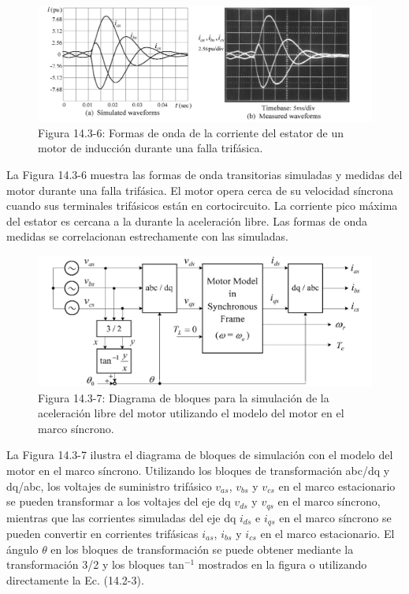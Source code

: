 \documentclass[letterpaper,12pt]{article}
\begin{document}
\begin{figure}[ht]
\centering
\includegraphics{graficos/img08.jpg}
\caption{Figura 14.3-6: Formas de onda de la corriente del estator de un motor de inducción durante una falla trifásica.}
\end{figure}
\FloatBarrier

La Figura 14.3-6 muestra las formas de onda transitorias simuladas y medidas del motor durante una falla trifásica. El motor opera cerca de su velocidad síncrona cuando sus terminales trifásicos están en cortocircuito. La corriente pico máxima del estator es cercana a la durante la aceleración libre. Las formas de onda medidas se correlacionan estrechamente con las simuladas.

\begin{figure}[ht]
\centering
\includegraphics{graficos/img09.jpg}
\caption{Figura 14.3-7: Diagrama de bloques para la simulación de la aceleración libre del motor utilizando el modelo del motor en el marco síncrono.}
\end{figure}
\FloatBarrier

La Figura 14.3-7 ilustra el diagrama de bloques de simulación con el modelo del motor en el marco síncrono. Utilizando los bloques de transformación abc/dq y dq/abc, los voltajes de suministro trifásico $v_{as}$, $v_{bs}$ y $v_{cs}$ en el marco estacionario se pueden transformar a los voltajes del eje dq $v_{ds}$ y $v_{qs}$ en el marco síncrono, mientras que las corrientes simuladas del eje dq $i_{ds}$ e $i_{qs}$ en el marco síncrono se pueden convertir en corrientes trifásicas $i_{as}$, $i_{bs}$ y $i_{cs}$ en el marco estacionario. El ángulo $\theta$ en los bloques de transformación se puede obtener mediante la transformación 3/2 y los bloques tan$^{-1}$ mostrados en la figura o utilizando directamente la Ec. (14.2-3).
\end{document}
